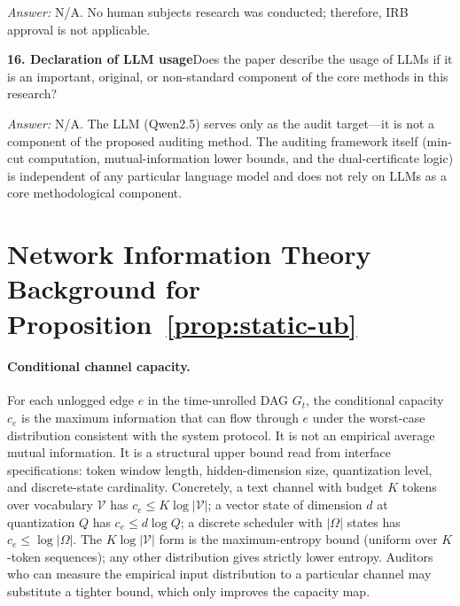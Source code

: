 \documentclass{article}
\begin{document}
  \emph{Answer:} N/A. No human subjects research was conducted; therefore, IRB
  approval is not applicable.

  \noindent\textbf{16. Declaration of LLM usage}\quad Does the paper describe
  the usage of LLMs if it is an important, original, or non-standard component
  of the core methods in this research?

  \emph{Answer:} N/A. The LLM (Qwen2.5) serves only as the audit target---it is
  not a component of the proposed auditing method. The auditing framework itself
   (min-cut computation, mutual-information lower bounds, and the
  dual-certificate logic) is independent of any particular language model and
  does not rely on LLMs as a core methodological component.

  \newpage

  \appendix

  \section{Network Information Theory Background for
  Proposition~\ref{prop:static-ub}}
  \label{app:netinfo}

  \paragraph{Conditional channel capacity.}
  For each unlogged edge $e$ in the time-unrolled DAG $G_t$, the conditional
  capacity $c_e$ is the maximum information that can flow through $e$ under the
  worst-case distribution consistent with the system protocol. It is not an
  empirical average mutual information. It is a structural upper bound read from
   interface specifications: token window length, hidden-dimension size,
  quantization level, and discrete-state cardinality. Concretely, a text channel
   with budget $K$ tokens over vocabulary $\mathcal{V}$ has $c_e \leq K \log
  |\mathcal{V}|$; a vector state of dimension $d$ at quantization $Q$ has $c_e
  \leq d \log Q$; a discrete scheduler with $|\Omega|$ states has $c_e \leq \log
   |\Omega|$. The $K \log |\mathcal{V}|$ form is the maximum-entropy bound
  (uniform over $K$-token sequences); any other distribution gives strictly
  lower entropy. Auditors who can measure the empirical input distribution to a
  particular channel may substitute a tighter bound, which only improves the
  capacity map.
\end{document}
